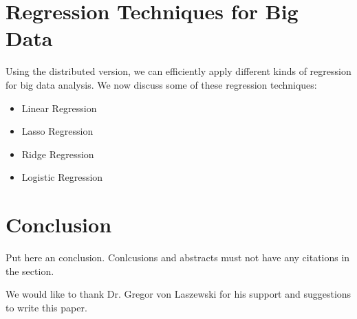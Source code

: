 \documentclass[sigconf]{acmart}
\begin{document}
\section{Regression Techniques for Big Data}

Using the distributed version, we can efficiently apply different kinds of regression for big data analysis. We now discuss some of these regression techniques:
\begin{itemize}
	\item Linear Regression
	\item Lasso Regression
	\item Ridge Regression
	\item Logistic Regression
\end{itemize}

\section{Conclusion}

Put here an conclusion. Conlcusions and abstracts must not have any
citations in the section.


\begin{acks}

  We would like to thank Dr. Gregor von Laszewski for his
  support and suggestions to write this paper.

\end{acks}


 
\end{document}
